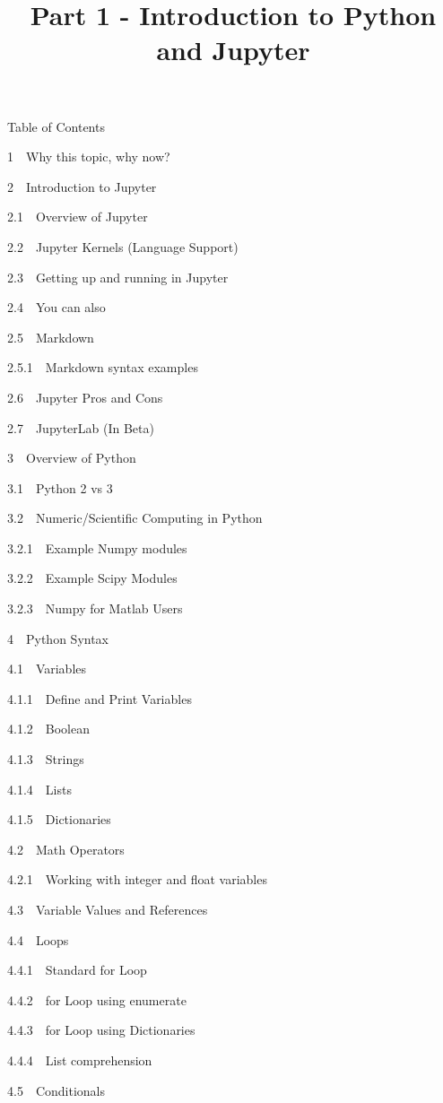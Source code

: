 \documentclass[11pt]{article}
\title{Part 1 - Introduction to Python and Jupyter}
\begin{document}
    
    
    \maketitle
    
    

    
    Table of Contents{}

{{1~~}Why this topic, why now?}

{{2~~}Introduction to Jupyter}

{{2.1~~}Overview of Jupyter}

{{2.2~~}Jupyter Kernels (Language Support)}

{{2.3~~}Getting up and running in Jupyter}

{{2.4~~}You can also}

{{2.5~~}Markdown}

{{2.5.1~~}Markdown syntax examples}

{{2.6~~}Jupyter Pros and Cons}

{{2.7~~}JupyterLab (In Beta)}

{{3~~}Overview of Python}

{{3.1~~}Python 2 vs 3}

{{3.2~~}Numeric/Scientific Computing in Python}

{{3.2.1~~}Example Numpy modules}

{{3.2.2~~}Example Scipy Modules}

{{3.2.3~~}Numpy for Matlab Users}

{{4~~}Python Syntax}

{{4.1~~}Variables}

{{4.1.1~~}Define and Print Variables}

{{4.1.2~~}Boolean}

{{4.1.3~~}Strings}

{{4.1.4~~}Lists}

{{4.1.5~~}Dictionaries}

{{4.2~~}Math Operators}

{{4.2.1~~}Working with integer and float variables}

{{4.3~~}Variable Values and References}

{{4.4~~}Loops}

{{4.4.1~~}Standard for Loop}

{{4.4.2~~}for Loop using enumerate}

{{4.4.3~~}for Loop using Dictionaries}

{{4.4.4~~}List comprehension}

{{4.5~~}Conditionals}
\end{document}
